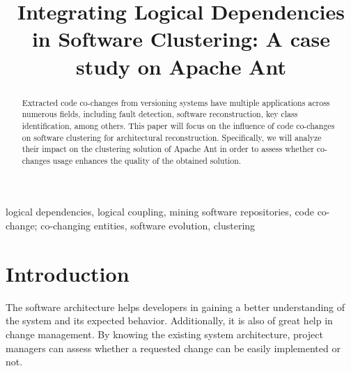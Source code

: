 \documentclass[conference]{IEEEtran}
\begin{document}
\title{Integrating Logical Dependencies in Software Clustering: A case study on Apache Ant}

\author{
\and
{}
}

\maketitle

\begin{abstract}
Extracted code co-changes from versioning systems have multiple applications across numerous fields, including fault detection, software reconstruction, key class identification, among others. This paper will focus on the influence of code co-changes on software clustering for architectural reconstruction. Specifically, we will analyze their impact on the clustering solution of Apache Ant in order to assess whether co-changes usage enhances the quality of the obtained solution.
\end{abstract}

\begin{IEEEkeywords}
logical dependencies, logical coupling, mining software repositories, code co-change; co-changing entities, software evolution, clustering
\end{IEEEkeywords}

\section{Introduction}

The software architecture helps developers in gaining a better understanding of the system and its expected behavior. Additionally, it is also of great help in change management. By knowing the existing system architecture, project managers can assess whether a requested change can be easily implemented or not.
\end{document}
